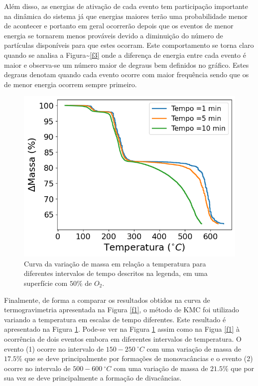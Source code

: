 \documentclass[11pt]{article}
\begin{document}
Além disso, as energias de ativação de cada evento tem participação importante na dinâmica do sistema já que energias maiores terão uma probabilidade menor de acontecer e portanto em geral ocorrerão depois que os eventos de menor energia se tornarem menos prováveis devido a diminuição do número de partículas disponíveis para que estes ocorram. Este comportamento se torna claro quando se analisa a Figura\textasciitilde{}\ref{f3} onde a diferença de energia entre cada evento é maior e observa-se um número maior de degraus bem definidos no gráfico. Estes degraus denotam quando cada evento ocorre com maior frequência sendo que os de menor energia ocorrem sempre primeiro.

\begin{figure}[!htbp]
\centering\includegraphics[scale=0.6]{figures/Temperatura-massa.png}
\caption{Curva da variação de massa em relação a temperatura para diferentes intervalos de tempo descritos na legenda, em uma superfície com $50\%$ de $O_2$.}
\label{f4}
\end{figure}


Finalmente, de forma a comparar os resultados obtidos na curva de termogravimetria apresentada na Figura \ref{f1}, o método de KMC foi utilizado variando a temperatura em escalas de tempo diferentes. Este resultado é apresentado na Figura \ref{f4}. Pode-se ver na Figura \ref{f4} assim como na Figua \ref{f1} à ocorrência de dois eventos embora em diferentes intervalos de temperatura. O evento (1) ocorre no intervalo de \(150-250~^\circ C\) com uma variação de massa de \(17.5\%\) que se deve principalmente por formações de monovacâncias e o evento (2) ocorre no intervalo de  \(500-600~^\circ C\) com uma variação de massa de \(21.5\%\) que por sua vez se deve principalmente a formação de divacâncias.






\end{document}
